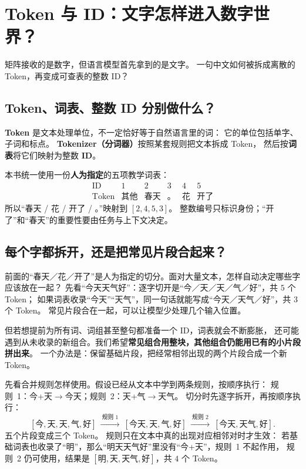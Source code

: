 \chapterrule
\section{Token 与 ID：文字怎样进入数字世界？}
\label{intro:tokenization}

\label{concept:token}

矩阵接收的是数字，但语言模型首先拿到的是文字。
一句中文如何被拆成离散的 Token，再变成可查表的整数 ID？

\subsection{Token、词表、整数 ID 分别做什么？}
\label{concept:vocabulary}

\textbf{Token} 是文本处理单位，不一定恰好等于自然语言里的词：
它的单位包括单字、子词和标点。
\textbf{Tokenizer（分词器）}按照某套规则把文本拆成 Token，
然后按\textbf{词表}将它们映射为整数 \textbf{ID}。

本书统一使用一份\textbf{人为指定}的五项教学词表：
\[
\begin{array}{c|ccccc}
\text{ID}&1&2&3&4&5\\\hline
\text{Token}&\text{其他}&\text{春天}&\text{。}&\text{花}&\text{开了}
\end{array}
\]
所以“春天 / 花 / 开了 / 。”映射到 $[2,4,5,3]$。
整数编号只标识身份；“开了”和“春天”的重要性要由任务与上下文决定。

\subsection{每个字都拆开，还是把常见片段合起来？}

前面的“春天／花／开了”是人为指定的切分。面对大量文本，怎样自动决定哪些字应该放在一起？
先看“今天天气好”：逐字切开是“今／天／天／气／好”，共 $5$ 个 Token；
如果词表收录“今天”“天气”，同一句话就能写成“今天／天气／好”，共 $3$ 个 Token。
常见片段合在一起，可以让模型少处理几个输入位置。

但若想提前为所有词、词组甚至整句都准备一个 ID，词表就会不断膨胀，
还可能遇到从未收录的新组合。我们希望\textbf{常见组合用整块，其他组合仍能用已有的小片段拼出来}。
一个办法是：保留基础片段，把经常相邻出现的两个片段合成一个新 Token。

先看合并规则怎样使用。假设已经从文本中学到两条规则，按顺序执行：
规则~1：今+天$\to$今天；规则~2：天+气$\to$天气。
切分时先逐字拆开，再按顺序执行：
\[
[\text{今},\text{天},\text{天},\text{气},\text{好}]
\ \xrightarrow{\ \text{规则 1}\ }\
[\text{今天},\text{天},\text{气},\text{好}]
\ \xrightarrow{\ \text{规则 2}\ }\
[\text{今天},\text{天气},\text{好}].
\]
五个片段变成三个 Token。
规则只在文本中真的出现对应相邻对时才生效：
若基础词表也收录了“明”，那么“明天天气好”里没有“今+天”，规则~1 不起作用，
规则~2 仍可使用，结果是 $[\text{明},\text{天},\text{天气},\text{好}]$，共 $4$ 个 Token。

